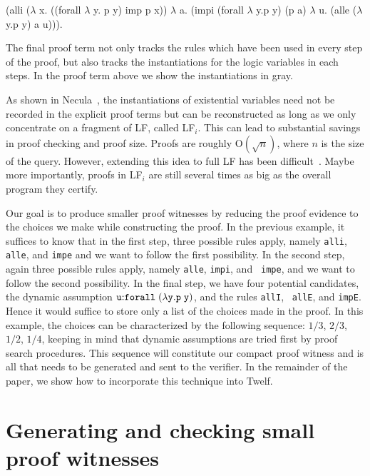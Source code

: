 \documentclass{llncs}
\newcommand{\mygray}[1]{{\color{gray}#1}}
\newcommand{\forallLF}{\tt{forall}\;}
\begin{document}
\begin{code}
(alli {\mygray{($\lambda\!\!$ x. ((forall $\lambda\!\!$ y. p y) imp p x))}}
   $\lambda\!\!$ a. (impi {\mygray{(forall $\lambda\!\!$ y.p y) (p a)}}
           $\lambda\!\!$ u. (alle {\mygray{($\lambda\!\!$ y.p y)}} a u))).
\end{code}

The final proof term not only tracks the rules which have been used in
every step of the proof, but also tracks the instantiations for the logic
variables in each steps. In the proof term above we show the
instantiations in gray.


As shown in Necula~\cite{Necula98lics}, the instantiations of
existential variables need not be recorded in the explicit proof terms
but can be reconstructed as long as we only concentrate on a fragment
of LF, called LF$_i$. This can lead to substantial savings in proof
checking and proof size. Proofs are roughly $\mathrm{O}(\sqrt{n})$,
where $n$ is the size of the query. However, extending this idea to
full LF has been difficult~\cite{Reed04lfm}. Maybe more importantly,
proofs in LF$_i$ are still several times as big as the overall program
they certify.

Our goal is to produce smaller proof witnesses by reducing the proof
evidence to the choices we make while constructing the proof.  In the
previous example, it suffices to know that in the first step, three
possible rules apply, namely {\tt alli}, {\tt alle}, and {\tt impe}
and we want to follow the first possibility. In the second step, again
three possible rules apply, namely {\tt alle}, {\tt impi}, and {\tt
impe}, and we want to follow the second possibility. In the final
step, we have four potential candidates, the dynamic assumption ${\tt
u}{:} \forallLF (\lambda y. p\; y)$, and the rules {\tt allI}, {\tt
allE}, and {\tt impE}.  Hence it would suffice to store only a list of
the choices made in the proof. In this example, the choices can be
characterized by the following sequence: $1/3$, $2/3$, $1/2$, $1/4$,
keeping in mind that dynamic assumptions are tried first by proof
search procedures. This sequence will constitute our compact proof
witness and is all that needs to be generated and sent to the
verifier. In the remainder of the paper, we show how to incorporate
this technique into Twelf.

\section{Generating and checking small proof witnesses}
\label{sec:oracles}
\end{document}
